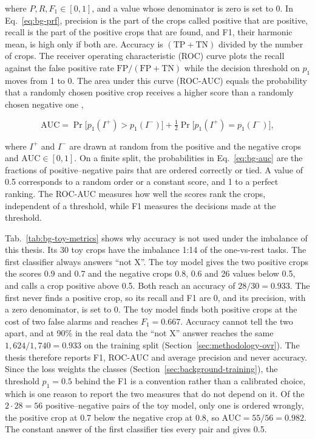 where $P, R, F_1 \in [0,1]$, and a value whose denominator is zero is set to 0. In
Eq.~\eqref{eq:bg-prf}, precision is the part of the crops called positive that are
positive, recall is the part of the positive crops that are found, and F1, their
harmonic mean, is high only if both are. Accuracy is $(\mathrm{TP} + \mathrm{TN})$ divided
by the number of crops. The receiver operating
characteristic (ROC) curve plots the recall against the false positive rate
$\mathrm{FP}/(\mathrm{FP} + \mathrm{TN})$ while the decision threshold on $p_1$ moves
from 1 to 0. The area under this curve (ROC-AUC) equals the probability that a randomly
chosen positive crop receives a higher score than a randomly chosen negative
one \citep{fawcett2006roc},

\begin{equation}
\mathrm{AUC} = \Pr\big[p_1(I^+) > p_1(I^-)\big]
+ \tfrac{1}{2} \Pr\big[p_1(I^+) = p_1(I^-)\big],
\label{eq:bg-auc}
\end{equation}

where $I^+$ and $I^-$ are drawn at random from the positive and the negative crops and
$\mathrm{AUC} \in [0,1]$. On a finite split, the probabilities in Eq.~\eqref{eq:bg-auc}
are the fractions of positive--negative pairs that are ordered correctly or tied. A
value of 0.5 corresponds to a random order or a constant score, and 1 to a perfect
ranking. The ROC-AUC measures how well the scores rank the crops, independent of a
threshold, while F1 measures the decisions made at the threshold.

Tab.~\ref{tab:bg-toy-metrics} shows why accuracy is not used under the imbalance of this
thesis. Its 30 toy crops have the imbalance 1:14 of the one-vs-rest tasks. The first classifier
always answers ``not X''. The toy model gives the two positive crops the scores 0.9 and 0.7 and the negative crops 0.8, 0.6 and
26 values below 0.5, and calls a crop positive above 0.5. Both reach an accuracy of
$28/30 = 0.933$. The first never finds a positive crop, so its recall and F1 are 0,
and its precision, with a zero denominator, is set to 0. The toy model finds both
positive crops at the cost of two false alarms and reaches $F_1 = 0.667$. Accuracy
cannot tell the two apart, and at 90\% in the real data the ``not X'' answer reaches the
same $1{,}624/1{,}740 = 0.933$ on the training split (Section~\ref{sec:methodology-ovr}).
The thesis therefore reports F1, ROC-AUC and average precision and never accuracy.
Since the loss weights the classes (Section~\ref{sec:background-training}), the threshold
$p_1 = 0.5$ behind the F1 is a convention rather than a calibrated choice, which is one
reason to report the two measures that do not depend on it. Of the
$2 \cdot 28 = 56$ positive--negative pairs of the toy model, only one is ordered wrongly, the positive crop at
0.7 below the negative crop at 0.8, so $\mathrm{AUC} = 55/56 = 0.982$. The constant
answer of the first classifier ties every pair and gives 0.5.

